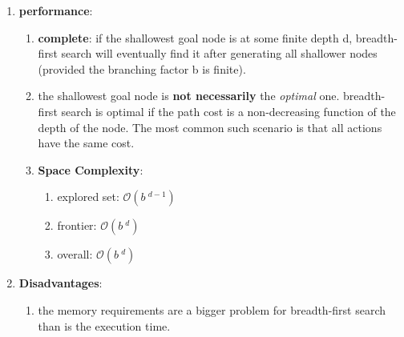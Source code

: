\begin{enumerate}[itemsep=0.2cm]
    \item \textbf{performance}:
    \begin{enumerate}[itemsep=0.2cm]
        \item \textbf{complete}: if the shallowest goal node is at some finite depth d, breadth-first search will eventually find it after generating all shallower nodes (provided the branching factor b is finite). 
        \hfill \cite{ai/book/Artificial-Intelligence-A-Modern-Approach/Russell-Norvig}

        \item  the shallowest goal node is \textbf{not necessarily} the \textit{optimal} one. 
        breadth-first search is optimal if the path cost is a non-decreasing function of the depth of the node.
        The most common such scenario is that all actions have the same cost.
        \hfill \cite{ai/book/Artificial-Intelligence-A-Modern-Approach/Russell-Norvig}

        \item \textbf{Space Complexity}:
        \begin{enumerate}[itemsep=0.1cm]
            \item explored set: $\mathcal{O}(b\ ^{d-1})$
            \hfill \cite{ai/book/Artificial-Intelligence-A-Modern-Approach/Russell-Norvig}

            \item frontier: $\mathcal{O}(b\ ^{d})$
            \hfill \cite{ai/book/Artificial-Intelligence-A-Modern-Approach/Russell-Norvig}

            \item overall: $\mathcal{O}(b\ ^{d})$
            \hfill \cite{ai/book/Artificial-Intelligence-A-Modern-Approach/Russell-Norvig}
        \end{enumerate}

    \end{enumerate}

    \item \textbf{Disadvantages}:
    \begin{enumerate}[itemsep=0.1cm]
        \item the memory requirements are a bigger problem for breadth-first search than is the execution time.
        \hfill \cite{ai/book/Artificial-Intelligence-A-Modern-Approach/Russell-Norvig}

        
    \end{enumerate}

\end{enumerate}


